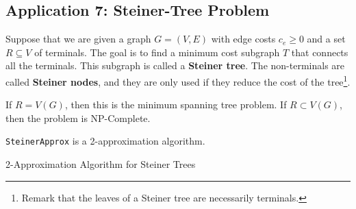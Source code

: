 \subsection{Application 7: Steiner-Tree Problem}
\begin{defn}
	Suppose that we are given a graph $G = (V, E)$ with edge costs $c_e \geq 0$ and a set $R \subseteq V$ of terminals. The goal is to find a minimum cost subgraph $T$ that connects all the terminals. This subgraph is called a \textbf{Steiner tree}. The non-terminals are called \textbf{Steiner nodes}, and they are only used if they reduce the cost of the tree\footnote{Remark that the leaves of a Steiner tree are necessarily terminals.}.
\end{defn}

\begin{cor}
	If $R = V(G)$, then this is the minimum spanning tree problem. If $R \subset V(G)$, then the problem is NP-Complete.
\end{cor}

 \begin{thm}
 	\texttt{SteinerApprox} is a 2-approximation algorithm.
 \end{thm}

\begin{algorithm}
	  \caption{2-Approximation Algorithm for Steiner Trees}\label{steineralgo}
\end{algorithm}


